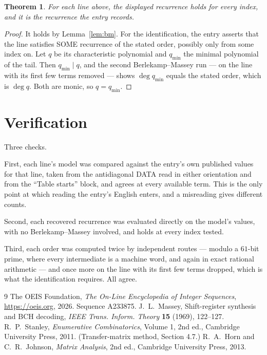 \documentclass[11pt,a4paper]{article}
\theoremstyle{plain}
\newtheorem{theorem}{Theorem}
\theoremstyle{definition}
\begin{document}
\begin{theorem}
For each line above, the displayed recurrence holds for every index, and it is the recurrence
the entry records.
\end{theorem}

\begin{proof}
It holds by Lemma~\ref{lem:bm}. For the identification, the entry asserts that the line
satisfies SOME recurrence of the stated order, possibly only from some index on. Let $q$ be its
characteristic polynomial and $q_{\min}$ the minimal polynomial of the tail. Then
$q_{\min}\mid q$, and the second Berlekamp--Massey run --- on the line with its first few
terms removed --- shows $\deg q_{\min}$ equals the stated order, which is $\deg q$. Both are
monic, so $q=q_{\min}$.
\end{proof}

\section{Verification}

Three checks.

First, each line's model was compared against the entry's own published values for that line,
taken from the antidiagonal DATA read in either orientation and from the ``Table starts''
block, and agrees at every available term. This is the only point at which reading the entry's
English enters, and a misreading gives different counts.

Second, each recovered recurrence was evaluated directly on the model's values, with no
Berlekamp--Massey involved, and holds at every index tested.

Third, each order was computed twice by independent routes --- modulo a $61$-bit prime, where
every intermediate is a machine word, and again in exact rational arithmetic --- and once more
on the line with its first few terms dropped, which is what the identification requires. All
agree.

\begin{thebibliography}{9}
 The OEIS Foundation, \emph{The On-Line Encyclopedia of Integer
Sequences}, \url{https://oeis.org}, 2026. Sequence A233875.
 J.~L.~Massey, Shift-register synthesis and BCH decoding, \emph{IEEE
Trans. Inform. Theory} \textbf{15} (1969), 122--127.
 R.~P.~Stanley, \emph{Enumerative Combinatorics}, Volume 1, 2nd ed.,
Cambridge University Press, 2011. (Transfer-matrix method, Section 4.7.)
 R.~A.~Horn and C.~R.~Johnson, \emph{Matrix Analysis}, 2nd ed., Cambridge
University Press, 2013.
\end{thebibliography}
\end{document}

